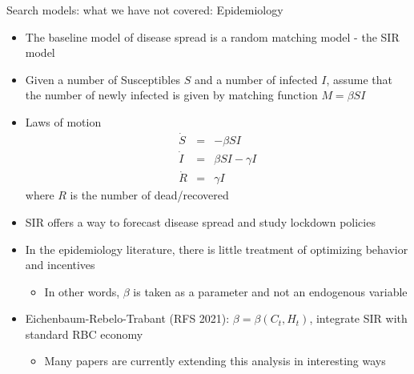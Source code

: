 \documentclass[9pt]{beamer}
\newcommand{\bit}{\begin{itemize}}
\newcommand{\eit}{\end{itemize}}
\begin{document}
\begin{frame}{Search models: what we have not covered: Epidemiology}

\bit
\setlength\itemsep{1em}

\item The baseline model of disease spread is a random matching model - the SIR model

\item Given a number of Susceptibles $S$ and a number of infected $I$, assume that the number of newly infected is given by matching function $M = \beta S I$

\item Laws of motion
\begin{eqnarray}
\dot{S} &=& - \beta S I \nonumber \\
\dot{I} &=& \beta S I - \gamma I \nonumber \\
\dot{R} &=& \gamma I \nonumber
\end{eqnarray}
where $R$ is the number of dead/recovered 

\item SIR offers a way to forecast disease spread and study lockdown policies 

\item In the epidemiology literature, there is little treatment of optimizing behavior and incentives
\bit
\item In other words, $\beta$ is taken as a parameter and not an endogenous variable
\eit

\item Eichenbaum-Rebelo-Trabant (RFS 2021): $\beta = \beta (C_t, H_t)$, integrate SIR with standard RBC economy
\bit
\item Many papers are currently extending this analysis in interesting ways
\eit


\eit

\end{frame}
\end{document}

